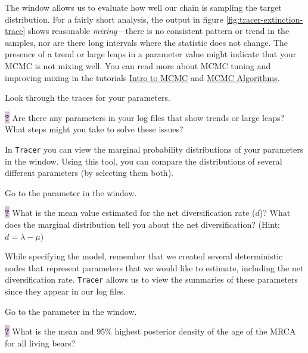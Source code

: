 The  window allows us to evaluate how well our chain is sampling the target distribution.
For a fairly short analysis, the output in figure \ref{fig:tracer-extinction-trace} shows reasonable \textit{mixing}---there is no consistent pattern or trend in the samples, nor are there long intervals where the statistic does not change.
The presence of a trend or large leaps in a parameter value might indicate that your MCMC is not mixing well.
You can read more about MCMC tuning and improving mixing in the tutorials \href{https://github.com/revbayes/revbayes_tutorial/raw/master/tutorial_TeX/RB_MCMC_Intro_Tutorial/RB_MCMC_Intro_Tutorial.pdf}{Intro to MCMC} and \href{https://github.com/revbayes/revbayes_tutorial/raw/master/tutorial_TeX/RB_MCMC_Tutorial/RB_MCMC_Tutorial.pdf}{MCMC Algorithms}.

\begin{framed}
Look through the traces for your parameters. 

\colorbox{Thistle}{\bf ?} Are there any parameters in your log files that show trends or large leaps? What steps might you take to solve these issues?
\end{framed}

In {\tt Tracer} you can view the marginal probability distributions of your parameters in the  window. 
Using this tool, you can compare the distributions of several different parameters (by selecting them both).

\begin{framed}
Go to the  parameter in the  window.

\colorbox{Thistle}{\bf ?} What is the mean value estimated for the net diversification rate ($d$)? What does the marginal distribution tell you about the net diversification? (Hint: $d = \lambda - \mu$)
\end{framed}

While specifying the model, remember that we created several deterministic nodes that represent parameters that we would like to estimate, including the net diversification rate. 
{\tt Tracer} allows us to view the summaries of these parameters since they appear in our log files.

\begin{framed}
Go to the  parameter in the  window.

\colorbox{Thistle}{\bf ?} What is the mean and 95\% highest posterior density of the age of the MRCA for all living bears? 
\end{framed}


